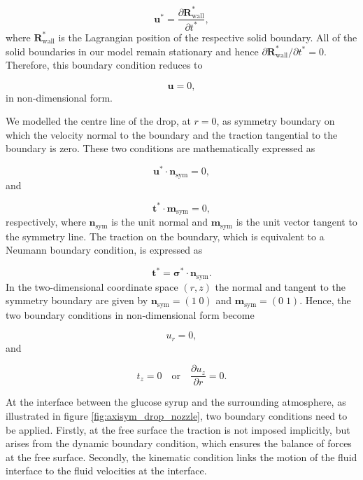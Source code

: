 \documentclass[aip,graphicx]{revtex4-1}
\newcommand{\sym}[1]{\text{#1}}
\newcommand{\pder}[2][]{\frac{\partial#1}{\partial#2}}
\newcommand{\vect}[1]{\bm{#1}}
\begin{document}
\begin{equation}
 \vect{u}^* = \pder[\vect{R}_{\sym{wall}}^*]{t^*},
 \label{eqn:ns_eqn_solid_wall_bc}
\end{equation}
where $\vect{R}_{\sym{wall}}^*$ is the Lagrangian position of the respective solid boundary. 
All of the solid boundaries in our model remain stationary and hence $\partial \vect{R}_{\sym{wall}}^*/ \partial t^* = 0$.
Therefore, this boundary condition reduces to

\begin{equation}
 \vect{u} = 0,
 \label{eqn:ns_eqn_solid_wall_bc_non_dim}
\end{equation}
in non-dimensional form.

We modelled the centre line of the drop, at $r=0$, as symmetry boundary on which the velocity normal to the boundary and the traction tangential to the boundary is zero. 
These two conditions are mathematically expressed as

\begin{equation}
 \vect{u}^* \cdot \vect{n}_{\sym{sym}} = 0,
\end{equation}
and

\begin{equation}
 \vect{t}^* \cdot \vect{m}_{\sym{sym}} = 0,
\end{equation}
respectively, where $\vect{n}_{\sym{sym}}$ is the unit normal and $\vect{m}_{\sym{sym}}$ is the unit vector tangent to the symmetry line.
The traction on the boundary, which is equivalent to a Neumann boundary condition, is expressed as

\begin{equation}
 \vect{t}^* = \vect{\sigma}^* \cdot \vect{n}_{\sym{sym}}.
 \label{eqn:ns_eqn_solid_wall_traction_bc}
\end{equation}
In the two-dimensional coordinate space $(r,z)$ the normal and tangent to the symmetry boundary are given by $\vect{n}_{\sym{sym}}= (1 \; 0)$ and $\vect{m}_{\sym{sym}} = (0 \; 1)$.
Hence, the two boundary conditions in non-dimensional form become

\begin{equation}
 u_r = 0,
 \label{eqn:ns_eqn_sym_bc_non_dim}
\end{equation}
and

\begin{equation}
 t_z = 0 \quad \text{or} \quad \pder[u_z]{r} = 0.
\end{equation}

At the interface between the glucose syrup and the surrounding atmosphere, as illustrated in figure \ref{fig:axisym_drop_nozzle}, two boundary conditions need to be applied. 
Firstly, at the free surface the traction is not imposed implicitly, but arises from the dynamic boundary condition, which ensures the balance of forces at the free surface. 
Secondly, the kinematic condition links the motion of the fluid interface to the fluid velocities at the interface.
\end{document}
